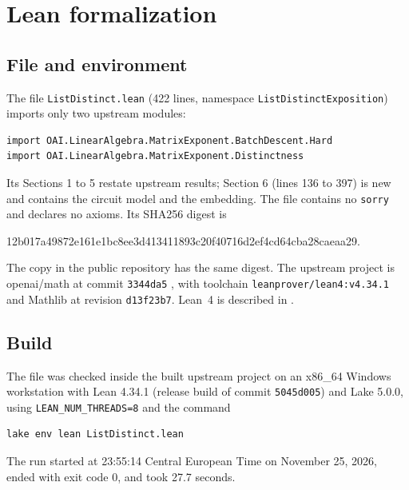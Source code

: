 \documentclass[11pt]{amsart}
\theoremstyle{definition}
\theoremstyle{remark}
\newcommand{\lean}[1]{\texttt{#1}}
\begin{document}
\section{Lean formalization}\label{sec:lean}

\subsection{File and environment}
The file \lean{ListDistinct.lean} (422 lines, namespace \lean{ListDistinctExposition}) imports only two upstream modules:
\begin{lstlisting}
import OAI.LinearAlgebra.MatrixExponent.BatchDescent.Hard
import OAI.LinearAlgebra.MatrixExponent.Distinctness
\end{lstlisting} Its Sections 1 to 5 restate upstream results; Section 6 (lines 136 to 397) is new and contains the circuit model and the embedding. The file contains no \lean{sorry} and declares no axioms. Its SHA256 digest is
\begin{center}\small\ttfamily 12b017a49872e161e1bc8ee3d413411893c20f40716d2ef4cd64cba28caeaa29.\end{center}
The copy in the public repository \cite{Companion} has the same digest. The upstream project is openai/math at commit \lean{3344da5} \cite{OAImath}, with toolchain \lean{leanprover/lean4:v4.34.1} and Mathlib \cite{Mathlib20} at revision \lean{d13f23b7}. Lean~4 is described in \cite{Lean4}.

\subsection{Build}
The file was checked inside the built upstream project on an x86\_64 Windows workstation with Lean 4.34.1 (release build of commit \lean{5045d005}) and Lake 5.0.0, using \lean{LEAN\_NUM\_THREADS=8} and the command
\begin{lstlisting}
lake env lean ListDistinct.lean
\end{lstlisting} The run started at 23:55:14 Central European Time on November 25, 2026, ended with exit code 0, and took 27.7 seconds.
\end{document}
